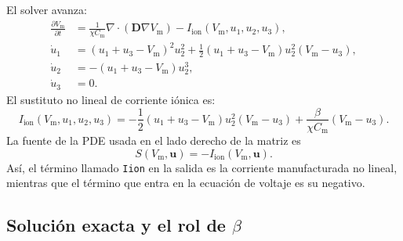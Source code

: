 \documentclass[11pt,a4paper]{article}
\newcommand{\code}[1]{\texttt{\small #1}}
\newcommand{\Vm}{V_{\text{m}}}
\newcommand{\Iion}{I_{\mathrm{ion}}}
\newcommand{\Dten}{\mathbf{D}}
\newcommand{\grad}{\nabla}
\newcommand{\divg}{\nabla\!\cdot}
\begin{document}
El solver avanza:
%
\begin{align}
  \frac{\partial \Vm}{\partial t}
  &=
  \frac{1}{\chi C_{\text{m}}}\divg(\Dten\grad\Vm)
  - \Iion(\Vm,u_1,u_2,u_3),
  \label{eq:mms-pde}\\
  \dot u_1
  &=
  (u_1+u_3-\Vm)^2 u_2^2
  + \frac{1}{2}(u_1+u_3-\Vm)u_2^2(\Vm-u_3),
  \label{eq:mms-u1}\\
  \dot u_2
  &=
  -(u_1+u_3-\Vm)u_2^3,
  \label{eq:mms-u2}\\
  \dot u_3 &= 0.
  \label{eq:mms-u3}
\end{align}
%
El sustituto no lineal de corriente iónica es:
%
\begin{equation}
  \Iion(\Vm,u_1,u_2,u_3)
  =
  -\frac{1}{2}(u_1+u_3-\Vm)u_2^2(\Vm-u_3)
  + \frac{\beta}{\chi C_{\text{m}}}(\Vm-u_3).
  \label{eq:mms-iion}
\end{equation}
%
La fuente de la PDE usada en el lado derecho de la matriz es
%
\begin{equation}
  S(\Vm,\mathbf{u})=-\Iion(\Vm,\mathbf{u}).
  \label{eq:mms-source}
\end{equation}
%
Así, el término llamado \code{Iion} en la salida es la corriente manufacturada no lineal,
mientras que el término que entra en la ecuación de voltaje es su negativo.

\subsection{Solución exacta y el rol de \texorpdfstring{$\beta$}{beta}}
\end{document}
